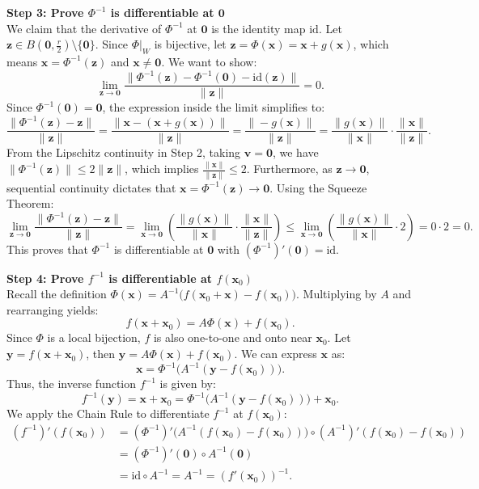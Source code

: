 \begin{pfbox}
\vspace{0.8em}
\noindent \textbf{Step 3: Prove $\Phi^{-1}$ is differentiable at $\mathbf{0}$}\\
We claim that the derivative of $\Phi^{-1}$ at $\mathbf{0}$ is the identity map $\text{id}$.
Let $\mathbf{z}\in B(\mathbf{0},\frac{r}{2})\setminus\{\mathbf{0}\}$. Since $\Phi|_W$ is bijective, let $\mathbf{z}=\Phi(\mathbf{x})=\mathbf{x}+g(\mathbf{x})$, which means $\mathbf{x}=\Phi^{-1}(\mathbf{z})$ and $\mathbf{x}\neq\mathbf{0}$.
We want to show:
$$ \lim_{\mathbf{z}\to\mathbf{0}}\frac{\|\Phi^{-1}(\mathbf{z})-\Phi^{-1}(\mathbf{0})-\text{id}(\mathbf{z})\|}{\|\mathbf{z}\|} = 0. $$
Since $\Phi^{-1}(\mathbf{0})=\mathbf{0}$, the expression inside the limit simplifies to:
$$ \frac{\|\Phi^{-1}(\mathbf{z})-\mathbf{z}\|}{\|\mathbf{z}\|} = \frac{\|\mathbf{x}-(\mathbf{x}+g(\mathbf{x}))\|}{\|\mathbf{z}\|} = \frac{\|-g(\mathbf{x})\|}{\|\mathbf{z}\|} = \frac{\|g(\mathbf{x})\|}{\|\mathbf{x}\|}\cdot\frac{\|\mathbf{x}\|}{\|\mathbf{z}\|}. $$
From the Lipschitz continuity in Step 2, taking $\mathbf{v}=\mathbf{0}$, we have $\|\Phi^{-1}(\mathbf{z})\| \le 2\|\mathbf{z}\|$, which implies $\frac{\|\mathbf{x}\|}{\|\mathbf{z}\|} \le 2$.
Furthermore, as $\mathbf{z}\to\mathbf{0}$, sequential continuity dictates that $\mathbf{x}=\Phi^{-1}(\mathbf{z})\to\mathbf{0}$.
Using the Squeeze Theorem:
$$ \lim_{\mathbf{z}\to\mathbf{0}}\frac{\|\Phi^{-1}(\mathbf{z})-\mathbf{z}\|}{\|\mathbf{z}\|} = \lim_{\mathbf{x}\to\mathbf{0}}\left(\frac{\|g(\mathbf{x})\|}{\|\mathbf{x}\|}\cdot\frac{\|\mathbf{x}\|}{\|\mathbf{z}\|}\right) \le \lim_{\mathbf{x}\to\mathbf{0}}\left(\frac{\|g(\mathbf{x})\|}{\|\mathbf{x}\|}\cdot 2\right) = 0 \cdot 2 = 0. $$
This proves that $\Phi^{-1}$ is differentiable at $\mathbf{0}$ with $(\Phi^{-1})'(\mathbf{0})=\text{id}$.

\vspace{0.8em}
\noindent \textbf{Step 4: Prove $f^{-1}$ is differentiable at $f(\mathbf{x}_0)$}\\
Recall the definition $\Phi(\mathbf{x}) = A^{-1}\big(f(\mathbf{x}_0+\mathbf{x})-f(\mathbf{x}_0)\big)$. Multiplying by $A$ and rearranging yields:
$$ f(\mathbf{x}+\mathbf{x}_0) = A\Phi(\mathbf{x}) + f(\mathbf{x}_0). $$
Since $\Phi$ is a local bijection, $f$ is also one-to-one and onto near $\mathbf{x}_0$. 
Let $\mathbf{y} = f(\mathbf{x}+\mathbf{x}_0)$, then $\mathbf{y} = A\Phi(\mathbf{x}) + f(\mathbf{x}_0)$. We can express $\mathbf{x}$ as:
$$ \mathbf{x} = \Phi^{-1}\big(A^{-1}(\mathbf{y}-f(\mathbf{x}_0))\big). $$
Thus, the inverse function $f^{-1}$ is given by:
$$ f^{-1}(\mathbf{y}) = \mathbf{x} + \mathbf{x}_0 = \Phi^{-1}\big(A^{-1}(\mathbf{y}-f(\mathbf{x}_0))\big) + \mathbf{x}_0. $$
We apply the Chain Rule to differentiate $f^{-1}$ at $f(\mathbf{x}_0)$:
\begin{align*}
(f^{-1})'(f(\mathbf{x}_0)) &= (\Phi^{-1})'\big(A^{-1}(f(\mathbf{x}_0)-f(\mathbf{x}_0))\big) \circ (A^{-1})'(f(\mathbf{x}_0)-f(\mathbf{x}_0)) \\
&= (\Phi^{-1})'(\mathbf{0}) \circ A^{-1}(\mathbf{0}) \\
&= \text{id} \circ A^{-1} = A^{-1} = (f'(\mathbf{x}_0))^{-1}.
\end{align*}

\end{pfbox}

